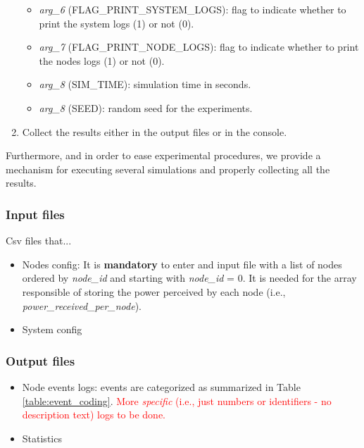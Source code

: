 \documentclass[a4paper]{article}
\begin{document}
\begin{enumerate}
\begin{itemize}
		            \item \textit{arg\_6} (FLAG\_PRINT\_SYSTEM\_LOGS): flag to indicate whether to print the system logs (1) or not (0).
		            \item \textit{arg\_7} (FLAG\_PRINT\_NODE\_LOGS): flag to indicate whether to print the nodes logs (1) or not (0).
		            \item \textit{arg\_8} (SIM\_TIME): simulation time in seconds.
		            \item \textit{arg\_8} (SEED): random seed for the experiments.
				\end{itemize}
		    \item Collect the results either in the output files or in the console.
		\end{enumerate}
	
		Furthermore, and in order to ease experimental procedures, we provide a mechanism for executing several simulations and properly collecting all the results. 
		
		\subsubsection{Input files}
		\label{section:input_files}	
		Csv files that...
		\begin{itemize}
			\item Nodes config: It is \textbf{mandatory} to enter and input file with a list of nodes ordered by \textit{node\_id} and starting with \textit{node\_id} = 0. It is needed for the array responsible of storing the power perceived by each node (i.e., \textit{power\_received\_per\_node}).
			\item System config
		\end{itemize}
	
		\subsubsection{Output files}
		\label{section:output_files}	
		\begin{itemize}
			\item Node events logs: events are categorized as summarized in Table \ref{table:event_coding}. \textcolor{red}{More \textit{specific} (i.e., just numbers or identifiers - no description text) logs to be done.}
			\item Statistics
		\end{itemize}
	
\end{document}
